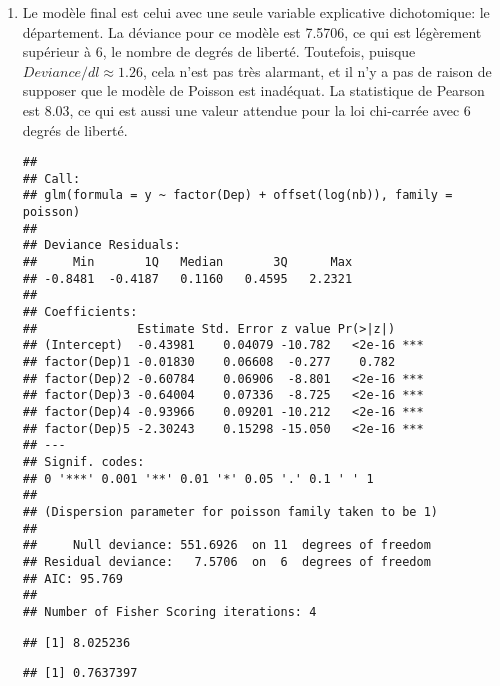 \begin{solution}{6.5}
\begin{enumerate}
\item Le modèle final est celui avec une seule variable explicative dichotomique: le département. La déviance pour ce modèle est 7.5706, ce qui est légèrement supérieur à 6, le nombre de degrés de liberté. Toutefois, puisque $Deviance/dl\approx1.26$, cela n'est pas très alarmant, et il n'y a pas de raison de supposer que le modèle de Poisson est inadéquat. La statistique de Pearson est  8.03, ce qui est aussi une valeur attendue pour la loi chi-carrée avec 6 degrés de liberté.
\begin{knitrout}
\color{fgcolor}\begin{kframe}
\begin{alltt}
 \hlkwb{<-} \hlopt{~}\hlopt{+}\hlstd{(}
\end{alltt}
\begin{verbatim}
##
## Call:
## glm(formula = y ~ factor(Dep) + offset(log(nb)), family = poisson)
##
## Deviance Residuals:
##     Min       1Q   Median       3Q      Max
## -0.8481  -0.4187   0.1160   0.4595   2.2321
##
## Coefficients:
##              Estimate Std. Error z value Pr(>|z|)
## (Intercept)  -0.43981    0.04079 -10.782   <2e-16 ***
## factor(Dep)1 -0.01830    0.06608  -0.277    0.782
## factor(Dep)2 -0.60784    0.06906  -8.801   <2e-16 ***
## factor(Dep)3 -0.64004    0.07336  -8.725   <2e-16 ***
## factor(Dep)4 -0.93966    0.09201 -10.212   <2e-16 ***
## factor(Dep)5 -2.30243    0.15298 -15.050   <2e-16 ***
## ---
## Signif. codes:
## 0 '***' 0.001 '**' 0.01 '*' 0.05 '.' 0.1 ' ' 1
##
## (Dispersion parameter for poisson family taken to be 1)
##
##     Null deviance: 551.6926  on 11  degrees of freedom
## Residual deviance:   7.5706  on  6  degrees of freedom
## AIC: 95.769
##
## Number of Fisher Scoring iterations: 4
\end{verbatim}
\begin{alltt}
\hlopt{-}\hlopt{^}\hlopt{/}
\end{alltt}
\begin{verbatim}
## [1] 8.025236
\end{verbatim}
\begin{alltt}
\hlstd{(}\hlstd{,}\hlstd{)}
\end{alltt}
\begin{verbatim}
## [1] 0.7637397
\end{verbatim}
\end{kframe}
\end{knitrout}


\end{enumerate}
\end{solution}
